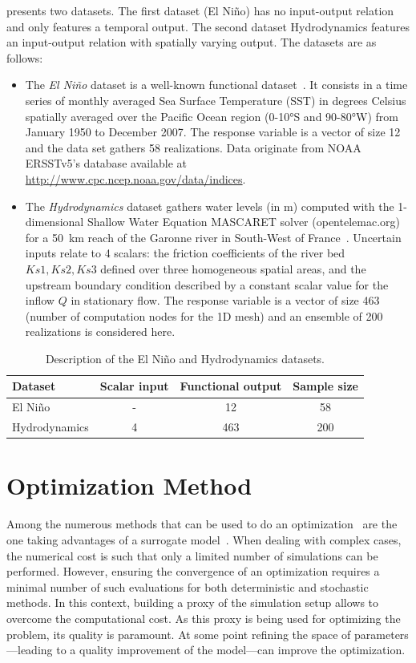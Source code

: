  presents two datasets. The first dataset (El Ni\~no) has no input-output relation and only features a temporal output. The second dataset Hydrodynamics features an input-output relation with spatially varying output. The datasets are as follows:
\begin{itemize}
\item The \emph{El Ni\~{n}o} dataset is a well-known functional dataset~\citep{Hyndman2009}. It consists in a time series of monthly averaged Sea Surface Temperature (SST) in degrees Celsius spatially averaged over the Pacific Ocean region (0-10°S and 90-80°W) from January 1950 to December 2007. The response variable is a vector of size 12 and the data set gathers 58 realizations. Data originate from NOAA ERSSTv5's database available at \href{http://www.cpc.ncep.noaa.gov/data/indices}{http://www.cpc.ncep.noaa.gov/data/indices}.
\item The \emph{Hydrodynamics} dataset gathers water levels (in m) computed with the 1-dimensional Shallow Water Equation MASCARET solver (opentelemac.org) for a 50~km reach of the Garonne river in South-West of France~\citep{Roy2017}. Uncertain inputs relate to 4 scalars: the friction coefficients of the river bed $Ks1, Ks2, Ks3$ defined over three homogeneous spatial areas, and the upstream boundary condition described by a constant scalar value for the inflow $Q$ in stationary flow. The response variable is a vector of size 463 (number of computation nodes for the 1D mesh) and an ensemble of 200 realizations is considered here. 
\end{itemize}

\begin{table}[!h]
\centering
\begin{tabular}{lccc}
\toprule
Dataset & Scalar input & Functional output & Sample size\\
\midrule %
El Ni\~no & - & 12 & 58\\
Hydrodynamics & 4 & 463 & 200\\
\bottomrule
\end{tabular}
\caption{Description of the El Ni\~no and Hydrodynamics datasets.}
\label{tab:dataset}
\end{table}

\chapter{Optimization Method}
\label{sec:optim_method}

Among the numerous methods that can be used to do an optimization~\cite{Cavazzuti2013} are the one taking advantages of a surrogate model~\cite{forrester2009}. When dealing with complex cases, the numerical cost is such that only a limited number of simulations can be performed. However, ensuring the convergence of an optimization requires a minimal number of such evaluations for both deterministic and stochastic methods. In this context, building a proxy of the simulation setup allows to overcome the computational cost. As this proxy is being used for optimizing the problem, its quality is paramount. At some point refining the space of parameters---leading to a quality improvement of the model---can improve the optimization.

